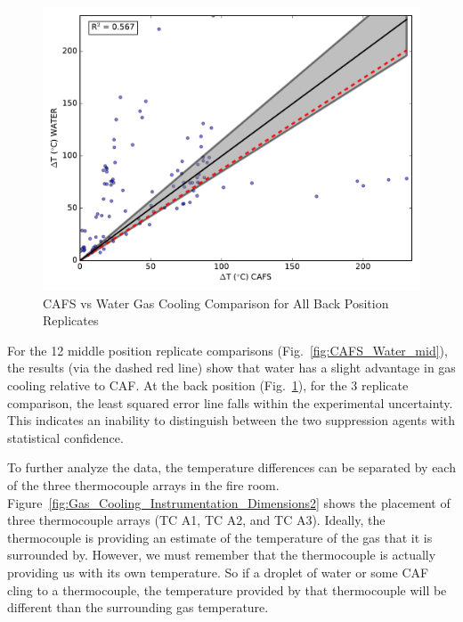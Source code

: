 \documentclass[12pt,oneside]{book}
\begin{document}
\begin{figure}[!ht]
	\includegraphics[width=.7\columnwidth]{../Figures/Gas_Cooling/Combined_fullback_scatter}
	\caption{CAFS vs Water Gas Cooling Comparison for All Back Position Replicates}
	\label{fig:CAFS_Water_full}
\end{figure}

For the 12 middle position replicate comparisons (Fig.~\ref{fig:CAFS_Water_mid}), the results (via the dashed red line) show that water has a slight advantage in gas cooling relative to CAF. At the back position (Fig.~\ref{fig:CAFS_Water_full}), for the 3 replicate comparison, the least squared error line falls within the experimental uncertainty. This indicates an inability to distinguish between the two suppression agents with statistical confidence. 

To further analyze the data, the temperature differences can be separated by each of the three thermocouple arrays in the fire room. Figure~\ref{fig:Gas_Cooling_Instrumentation_Dimensions2} shows the placement of three thermocouple arrays (TC A1, TC A2, and TC A3).  Ideally, the thermocouple is providing an estimate of the temperature of the gas that it is surrounded by.  However, we must remember that the thermocouple is actually providing us with its own temperature.  So if a droplet of water or some CAF cling to a thermocouple, the temperature provided by that thermocouple will be different than the surrounding gas temperature.  
\end{document}
